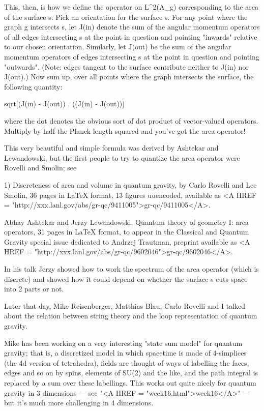 This, then, is how we define the operator on L^2(A_g) corresponding to
the area of the surface s.  Pick an orientation for the surface s.
For any point where the graph g intersects s, let J(in) denote the sum
of the angular momentum operators of all edges intersecting s at the
point in question and pointing "inwards" relative to our chosen
orientation.  Similarly, let J(out) be the sum of the angular momentum
operators of edges intersecting s at the point in question and
pointing "outwards".  (Note: edges tangent to the surface contribute
neither to J(in) nor J(out).)  Now sum up, over all points where the
graph intersects the surface, the following quantity:

sqrt[(J(in) - J(out)) . ((J(in) - J(out))]

where the dot denotes the obvious sort of dot product of vector-valued
operators.  Multiply by half the Planck length squared and you've got the
area operator!  

This very beautiful and simple formula was derived by Ashtekar and
Lewandowski, but the first people to try to quantize the area operator
were Rovelli and Smolin; see

1) Discreteness of area and volume in quantum gravity, by Carlo Rovelli
and Lee Smolin, 36 pages in LaTeX format, 13 figures uuencoded,
available as <A HREF = "http://xxx.lanl.gov/abs/gr-qc/9411005">gr-qc/9411005</A>.

Abhay Ashtekar and Jerzy Lewandowski, Quantum theory of geometry I:
area operators, 31 pages in LaTeX format, to appear in the Classical
and Quantum Gravity special issue dedicated to Andrzej Trautman,
preprint available as <A HREF = "http://xxx.lanl.gov/abs/gr-qc/9602046">gr-qc/9602046</A>.

In his talk Jerzy showed how to work the spectrum of the area operator
(which is discrete) and showed how it could depend on whether the
surface s cuts space into 2 parts or not.

Later that day, Mike Reisenberger, Matthias Blau, Carlo Rovelli and I
talked about the relation between string theory and the loop
representation of quantum gravity.  

Mike has been working on a very interesting "state sum model" for
quantum gravity; that is, a discretized model in which spacetime is
made of 4-simplices (the 4d version of tetrahedra), fields are thought
of ways of labelling the faces, edges and so on by spins, elements of
SU(2) and the like, and the path integral is replaced by a sum over
these labellings.  This works out quite nicely for quantum gravity in
3 dimensions --- see "<A HREF = "week16.html">week16</A>" --- but it's much more challenging in
4 dimensions.  

